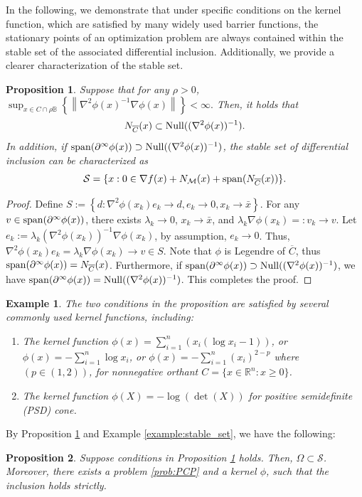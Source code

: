 \documentclass[11pt]{article}
\newcommand{\R}{\mathbb R}
\newcommand{\cM}{\mathcal M}
\newcommand{\cS}{\mathcal S}
\def\norm#1{\left\|#1\right\|}
\newtheorem{proposition}{Proposition}[section]
\newtheorem{example}{Example}[section]
\begin{document}
In the following, we demonstrate that under specific conditions on the kernel function, which are satisfied by many widely used barrier functions, the stationary points of an optimization problem are always contained within the stable set of the associated differential inclusion. Additionally, we provide a clearer characterization of the stable set.
\begin{proposition}
\label{prop:relation_NC_Null}
Suppose that for any $\rho>0$, $\sup_{x\in C\cap\rho\mathbb{B}}\left\{\norm{\nabla^2\phi(x)^{-1}\nabla\phi(x)}\right\}<\infty.$ Then, it holds that 
\[
N_{\overline{C}}(x)\subset{\rm Null}((\nabla^2\phi(x))^{-1}).
\]
In addition, if ${\rm span}(\partial^\infty\phi(x))\supset{\rm Null}((\nabla^2\phi(x))^{-1})$, the stable set of differential inclusion can be characterized as 
\[
\cS=\{x:0\in\nabla f(x)+N_\cM(x)+{\rm span}(N_{\overline{C}}(x))\}.
\]
\end{proposition}
\begin{proof}
Define $S:=\left\{d:\nabla^2\phi(x_k)e_k\rightarrow d,e_k\rightarrow0,x_k\rightarrow\bar x\right\}$. For any $v\in{\rm span}(\partial^\infty\phi(x))$, there exists $\lambda_k\rightarrow0$, $x_k\rightarrow\bar x$, and $\lambda_k\nabla\phi(x_k)=:v_k\rightarrow v$. Let $e_k:=\lambda_k(\nabla^2\phi(x_k))^{-1}\nabla\phi(x_k)$, by assumption, $e_k\rightarrow0$. Thus, $\nabla^2\phi(x_k)e_k=\lambda_k\nabla\phi(x_k)\rightarrow v\in S$. Note that $\phi$ is Legendre of $\overline{C}$, thus ${\rm span}(\partial^\infty\phi(x))=N_{\overline{C}}(x)$. Furthermore, if ${\rm span}(\partial^\infty\phi(x))\supset{\rm Null}((\nabla^2\phi(x))^{-1})$, we have ${\rm span}(\partial^\infty\phi(x))={\rm Null}((\nabla^2\phi(x))^{-1})$. This completes the proof.
\end{proof}
\begin{example}
The two conditions in the proposition are satisfied by several commonly used kernel functions, including:
    \begin{enumerate}
        \item The kernel function $\phi(x)=\sum_{i=1}^n(x_i(\log x_i-1))$, or $\phi(x)=-\sum_{i=1}^n\log x_i$, or $\phi(x)=-\sum_{i=1}^n(x_i)^{2-p}$ where $(p\in(1,2))$, for nonnegative orthant $C=\{x\in\R^n:x\geq0\}$.
        \item The kernel function $\phi(X)=-\log(\det(X))$ for positive semidefinite (PSD) cone.
    \end{enumerate}
\end{example}


By Proposition \ref{prop:relation_NC_Null} and Example \ref{example:stable_set}, we have the following:
\begin{proposition}
Suppose conditions in Proposition \ref{prop:relation_NC_Null} holds. Then, $\Omega\subset\cS$. Moreover, there exists a problem \eqref{prob:PCP} and a kernel $\phi$, such that the inclusion holds strictly.   
\end{proposition}
\end{document}
